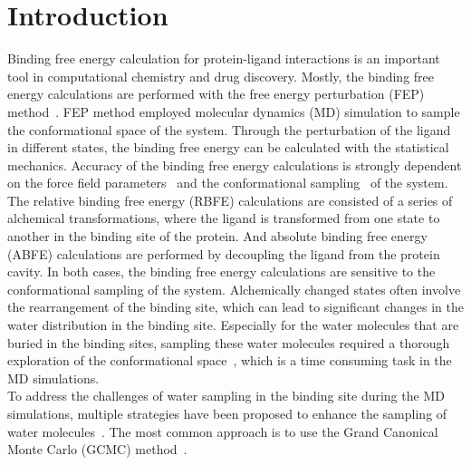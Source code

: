\documentclass[journal=jacsat,manuscript=article]{achemso}
\begin{document}
\section{Introduction}
Binding free energy calculation for protein-ligand interactions is an important tool in computational chemistry and drug discovery.
Mostly, the binding free energy calculations are performed with the free energy perturbation (FEP) method~\cite{jiang2010free, wang2019protein, Qian2024}.
FEP method employed molecular dynamics (MD) simulation to sample the conformational space of the system.
Through the perturbation of the ligand in different states, the binding free energy can be calculated with the statistical mechanics.
Accuracy of the binding free energy calculations is strongly dependent on the force field parameters~\cite{Ding2023, 17c36m, lu2021opls4, he2022recent, vanommeslaeghe2012automationI, vanommeslaeghe2012automationII} 
and the conformational sampling~\cite{15rex, wang2011replica, hritz2008hamiltonian} of the system.\\
\newline
The relative binding free energy (RBFE) calculations are consisted of a series of alchemical transformations, 
where the ligand is transformed from one state to another in the binding site of the protein.
And absolute binding free energy (ABFE) calculations are performed by decoupling the ligand from the protein cavity.
In both cases, the binding free energy calculations are sensitive to the conformational sampling of the system.
Alchemically changed states often involve the rearrangement of the binding site, 
which can lead to significant changes in the water distribution in the binding site.
Especially for the water molecules that are buried in the binding sites,
sampling these water molecules required a thorough exploration of the conformational space~\cite{zhou2009theory, cozzini2004free, li2007water}, 
which is a time consuming task in the MD simulations. \\
\newline
To address the challenges of water sampling in the binding site during the MD simulations,
multiple strategies have been proposed to enhance the sampling of water molecules~\cite{Wagle2024,ross2020enhancing,Ge2022,ben2021fast,Deng2024,Liu2025}.
The most common approach is to use the Grand Canonical Monte Carlo (GCMC) method~\cite{ross2015water, ross2020enhancing, Aldeghi2018, Bodnarchuk2014}.
\end{document}
